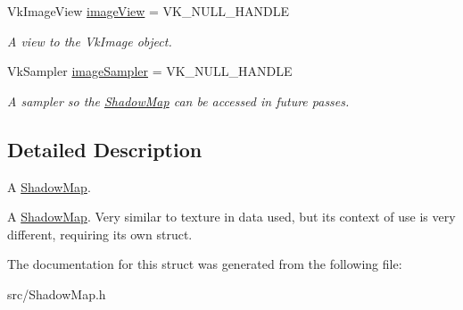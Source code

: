 \begin{DoxyCompactItemize}
Vk\+Image\+View \mbox{\hyperlink{struct_shadow_map_ad7e6e3c82f63f39a518232232058c4bd}{image\+View}} = V\+K\+\_\+\+N\+U\+L\+L\+\_\+\+H\+A\+N\+D\+LE
\begin{DoxyCompactList}\small\item\em A view to the Vk\+Image object. \end{DoxyCompactList}\item 
\mbox{\label{struct_shadow_map_a42e3393495fc99e006a627b072d08806}} 
Vk\+Sampler \mbox{\hyperlink{struct_shadow_map_a42e3393495fc99e006a627b072d08806}{image\+Sampler}} = V\+K\+\_\+\+N\+U\+L\+L\+\_\+\+H\+A\+N\+D\+LE
\begin{DoxyCompactList}\small\item\em A sampler so the \mbox{\hyperlink{struct_shadow_map}{Shadow\+Map}} can be accessed in future passes. \end{DoxyCompactList}\end{DoxyCompactItemize}


\subsection{Detailed Description}
A \mbox{\hyperlink{struct_shadow_map}{Shadow\+Map}}. 

A \mbox{\hyperlink{struct_shadow_map}{Shadow\+Map}}. Very similar to texture in data used, but its context of use is very different, requiring its own struct. 

The documentation for this struct was generated from the following file\+:\begin{DoxyCompactItemize}
\item 
src/Shadow\+Map.\+h\end{DoxyCompactItemize}
